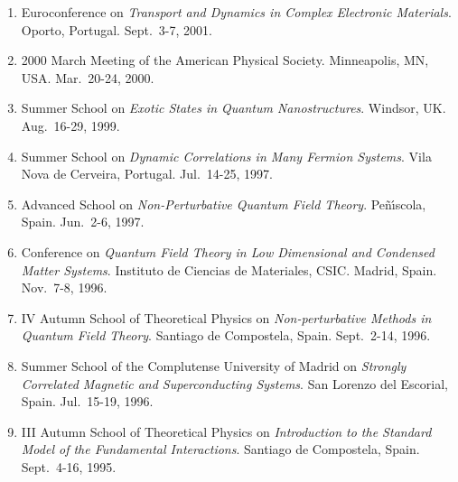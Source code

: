 \documentclass{article}
\begin{document}
\begin{enumerate}
\item
Euroconference on 
{\it Transport and Dynamics in Complex Electronic Materials}.
Oporto, Portugal. 
Sept.~3-7, 2001. 

\item 
2000 March Meeting of the American Physical Society. 
Minneapolis, MN, USA. 
Mar.~20-24, 2000.

\item 
Summer School on 
{\it Exotic States in Quantum Nanostructures}.
Windsor, UK. 
Aug.~16-29, 1999.

\item 
Summer School on 
{\it Dynamic Correlations in Many Fermion Systems}. 
Vila Nova de Cerveira, Portugal. 
Jul.~14-25, 1997.

\item
Advanced School on {\it Non-Perturbative Quantum Field Theory}. 
Pe\~n\'{\i}scola, Spain. 
Jun.~2-6, 1997.

\item 
Conference on 
{\it Quantum Field Theory in Low Dimensional and Condensed Matter Systems}.
Instituto de Ciencias de Materiales, CSIC. Madrid, Spain. 
Nov.~7-8, 1996.

\item  
IV Autumn School of Theoretical Physics on
{\it Non-perturbative Methods in Quantum Field Theory}.
Santiago de Compostela, Spain. 
Sept.~2-14, 1996.

\item  
Summer School of the Complutense University of Madrid on
{\it Strongly Correlated Magnetic and Superconducting Systems}.
San Lorenzo del Escorial, Spain. 
Jul.~15-19, 1996.

\item  
III Autumn School of Theoretical Physics on
{\it Introduction to the Standard Model of the Fundamental Interactions}.
Santiago de Compostela, Spain. 
Sept.~4-16, 1995. 
\end{enumerate}

\newpage

\end{document}
